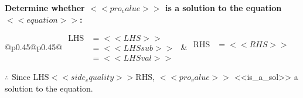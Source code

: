 \noindent \textbf{Determine whether \(<<pro_value>>\) is a solution to the equation \(<<equation>>\):}
\vspace{4pt}  %

\noindent
\renewcommand{\arraystretch}{1.3} %
\begin{tabular}{@{}p{0.45\linewidth}@{}p{0.45\linewidth}@{}}
    \(\begin{aligned}
        \text{LHS} &= <<LHS>> \\
                   &= <<LHSsub>> \\
                   &= <<LHSval>>
    \end{aligned}\) &
    \(\begin{aligned}
        \text{RHS} &= <<RHS>>\\
                   & \\
                   &
    \end{aligned}\)
\end{tabular}
\renewcommand{\arraystretch}{1.0} %
\vspace{2pt}  %

\noindent \(\therefore\) Since \(\text{LHS} <<side_equality>> \text{RHS}\), \(<<pro_value>>\) <<is_a_sol>> a solution to the equation.